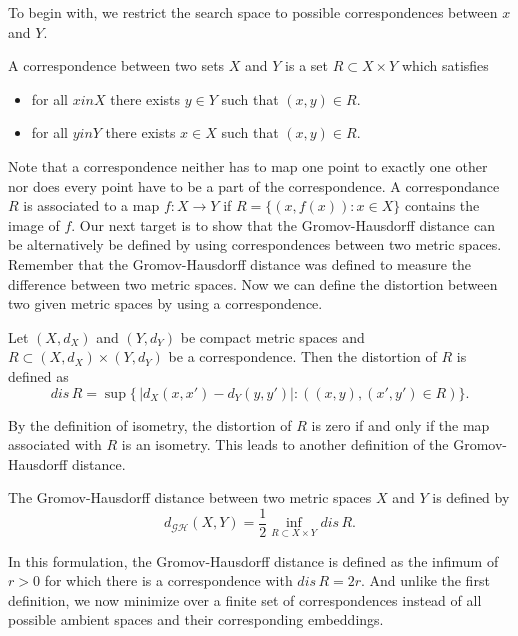 To begin with, we restrict the search space to possible correspondences between $x$ and $Y$.
\begin{mydef}[correspondence]
	A correspondence between two sets $X$ and $Y$ is a set $R \subset X \times Y$ which satisfies
	\begin{itemize}
		\item for all $x in X$ there exists $y\in Y$ such that $(x,y) \in R$.
		\item for all $y in Y$ there exists $x\in X$ such that $(x,y) \in R$.
	\end{itemize}
\end{mydef}
Note that a correspondence neither has to map one point to exactly one other nor does every point have to be a part of the correspondence.
A correspondance $R$ is associated to a map $f: X \rightarrow Y$ if $R = \{(x,f(x)) :x \in X\}$ contains the image of $f$.
Our next target is to show that the Gromov-Hausdorff distance can be alternatively be defined by using correspondences between two metric spaces.
Remember that the Gromov-Hausdorff distance was defined to measure the difference between two metric spaces.
Now we can define the distortion between two given metric spaces by using a correspondence.
\begin{mydef}
	Let $(X,d_X)$ and $(Y,d_Y)$ be compact metric spaces and $R \subset (X,d_X) \times (Y,d_Y)$ be a correspondence.
	Then the distortion of $R$ is defined as
	$$dis\,R = \sup\{\,|d_X(x,x') - d_Y(y,y')|: \left( (x,y), (x',y') \in R \right)\}.$$
\end{mydef}
By the definition of isometry, the distortion of $R$ is zero if and only if the map associated with $R$ is an isometry.
This leads to another definition of the Gromov-Hausdorff distance.
\begin{mydef}
	The Gromov-Hausdorff distance between two metric spaces $X$ and $Y$ is defined by
	$$d_\mathcal{GH}(X,Y) = \frac{1}{2} \inf_{R \subset X \times Y} dis \, R.$$
\end{mydef}
In this formulation, the Gromov-Hausdorff distance is defined as the infimum of $r > 0$ for which there is a correspondence with $dis\,R = 2r$.
And unlike the first definition, we now minimize over a finite set of correspondences instead of all possible ambient spaces and their corresponding embeddings.

